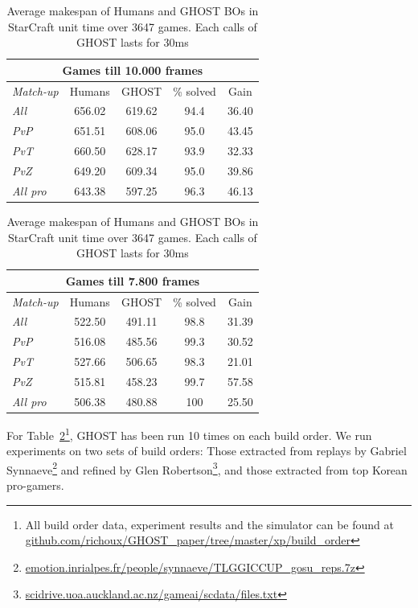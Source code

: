 \documentclass[journal]{IEEEtran}
\newcommand{\ghost}{\textsc{GHOST}\xspace}
\begin{document}
\begin{table}[ht]
  \caption{Average  makespan  of Humans  and  \ghost  BOs  in
    StarCraft unit time over 3647 games. Each calls  of \ghost
    lasts for 30ms}
  \label{tab:bo}
  \centering
  \begin{tabular}{|l|c|c|c|c|} 
    \hline
    \multicolumn{5}{|c|}{Games till 10.000 frames} \\ 
    \hline
    {\em Match-up} & Humans & \ghost & \% solved &
    Gain \\ 
    \hline
    {\em All} & 656.02 & 619.62 & 94.4 & 36.40\\
    {\em PvP} & 651.51 & 608.06 & 95.0 & 43.45\\
    {\em PvT} & 660.50 & 628.17 & 93.9 & 32.33\\
    {\em PvZ} & 649.20 & 609.34 & 95.0 & 39.86\\
    \hline
    \hline
    {\em All pro} & 643.38 & 597.25 & 96.3 & 46.13\\
    \hline
  \end{tabular}
  \begin{tabular}{|l|c|c|c|c|} 
    \hline
    \multicolumn{5}{|c|}{Games till 7.800 frames} \\ 
    \hline
    {\em Match-up} & Humans & \ghost & \% solved &
    Gain \\ 
    \hline
    {\em All} & 522.50 & 491.11 & 98.8 & 31.39\\
    {\em PvP} & 516.08 & 485.56 & 99.3 & 30.52\\
    {\em PvT} & 527.66 & 506.65 & 98.3 & 21.01\\
    {\em PvZ} & 515.81 & 458.23 & 99.7 & 57.58\\ 
    \hline
    \hline
    {\em All pro} & 506.38 & 480.88 & 100 & 25.50\\
    \hline
  \end{tabular}  
\end{table}

For  Table~\ref{tab:bo}\footnote{All  build   order  data,  experiment
  results     and     the     simulator    can     be     found     at
  \href{https://github.com/richoux/GHOST\_paper/tree/master/xp/build\_order}{github.com/richoux/GHOST\_paper/tree/master/xp/build\_order}},
\ghost has been  run 10 times on each build  order. We run experiments
on two sets  of build orders: Those extracted from  replays by Gabriel
Synnaeve\footnote{\href{http://emotion.inrialpes.fr/people/synnaeve/TLGGICCUP\_gosu\_reps.7z}{emotion.inrialpes.fr/people/synnaeve/TLGGICCUP\_gosu\_reps.7z}}
and                  refined                  by                  Glen
Robertson\footnote{\href{http://scidrive.uoa.auckland.ac.nz/gameai/scdata/files.txt}{scidrive.uoa.auckland.ac.nz/gameai/scdata/files.txt}},
and those extracted from top Korean pro-gamers.
\end{document}

